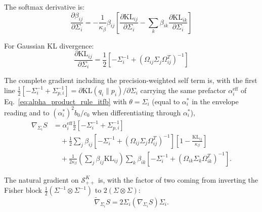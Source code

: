 \documentclass[11pt]{article}
\begin{document}
The softmax derivative is:
\begin{equation}
\frac{\partial \beta_{ij}}{\partial \Sigma_i} = -\frac{1}{\kappa_\beta} \beta_{ij} \left[\frac{\partial \mathrm{KL}_{ij}}{\partial \Sigma_i} - \sum_k \beta_{ik} \frac{\partial \mathrm{KL}_{ik}}{\partial \Sigma_i}\right]
\end{equation}

For Gaussian KL divergence:
\begin{equation}
\frac{\partial \mathrm{KL}_{ij}}{\partial \Sigma_i} = \frac{1}{2}\left[-\Sigma_i^{-1} + (\Omega_{ij}\Sigma_j\Omega_{ij}^T)^{-1}\right]
\end{equation}

The complete gradient including the precision-weighted self term is, with the first line $\frac{1}{2}[-\Sigma_i^{-1} + \Sigma_{p,i}^{-1}] = \partial \mathrm{KL}(q_i \| p_i)/\partial \Sigma_i$ carrying the same prefactor $\alpha_i^{\mathrm{eff}}$ of Eq.~\eqref{eq:alpha_product_rule_itfb} with $\theta = \Sigma_i$ (equal to $\alpha_i^*$ in the envelope reading and to $(\alpha_i^*)^2 b_0/c_0$ when differentiating through $\alpha_i^*$),
\begin{align}
\nabla_{\Sigma_i} S &= \alpha_i^{\mathrm{eff}}\frac{1}{2}\left[-\Sigma_i^{-1} + \Sigma_{p,i}^{-1}\right] \nonumber \\
&\quad + \frac{1}{2}\sum_j \beta_{ij} \left[-\Sigma_i^{-1} + (\Omega_{ij}\Sigma_j\Omega_{ij}^T)^{-1}\right]\left[1 - \frac{\mathrm{KL}_{ij}}{\kappa_\beta}\right] \nonumber \\
&\quad + \frac{1}{2\kappa_\beta}\left(\sum_j \beta_{ij}\mathrm{KL}_{ij}\right) \sum_k \beta_{ik} \left[-\Sigma_i^{-1} + (\Omega_{ik}\Sigma_k\Omega_{ik}^T)^{-1}\right].
\end{align}

The natural gradient on $\mathcal{S}_{++}^K$ is, with the factor of two coming from inverting the Fisher block $\tfrac{1}{2}(\Sigma^{-1}\otimes\Sigma^{-1})$ to $2(\Sigma\otimes\Sigma)$:
\begin{equation}
\tilde{\nabla}_{\Sigma_i} S = 2\Sigma_i (\nabla_{\Sigma_i} S) \Sigma_i.
\end{equation}
\end{document}
